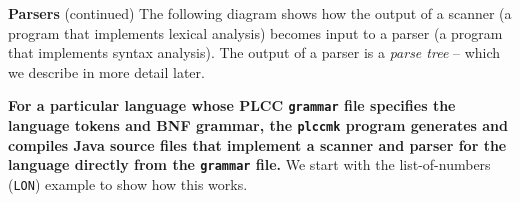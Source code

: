 \begin{minipage}[t]{\sw}
\slidenumber
\LARGE
{\bf Parsers} (continued)\exx
The following diagram shows how the output of a scanner
(a program that implements lexical analysis)
becomes input to a parser
(a program that implements syntax analysis).
The output of a parser is a {\em parse tree} --
which we describe in more detail later.\exx
\centerline{}\exx
{\bf For a particular language whose PLCC \verb'grammar' file
specifies the language tokens and BNF grammar,
the \verb'plccmk' program generates and compiles Java source files
that implement a scanner and parser for the language
directly from the \verb'grammar' file.}\exx
We start with the list-of-numbers (\verb'LON') example
to show how this works.
\end{minipage}
\clearpage
